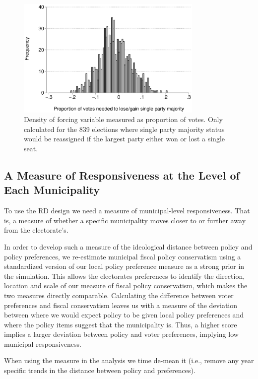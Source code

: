 \documentclass[a4paper,12pt]{article}
\begin{document}
\begin{figure}[htbp] 
	\centering

	\includegraphics[width=0.8\textwidth]{distpct.eps}
	\caption{Density of forcing variable measured as proportion of votes. Only calculated for the 839 elections where single party majority status would be reassigned if the largest party either won or lost a single seat.}
	\label{figure:forcing}
\end{figure}

\subsection{A Measure of Responsiveness at the Level of Each Municipality}

To use the RD design we need a measure of municipal-level responsiveness. That is, a measure of whether a specific municipality moves closer to or further away from the electorate's. 

In order to develop such a measure of the ideological distance between policy and policy preferences, we re-estimate municipal fiscal policy conservatism using a standardized version of our local policy preference measure as a strong prior in the simulation. This allows the electorates preferences to identify the direction, location and scale of our measure of fiscal policy conservatism, which makes the two measures directly comparable. Calculating the difference between voter preferences and fiscal conservatism leaves us with a measure of the deviation between where we would expect policy to be given local policy preferences and where the policy items suggest that the municipality is. Thus, a higher score implies a larger deviation between policy and voter preferences, implying low municipal responsiveness.

When using the measure in the analysis we time de-mean it (i.e., remove any year specific trends in the distance between policy and preferences).
\end{document}
